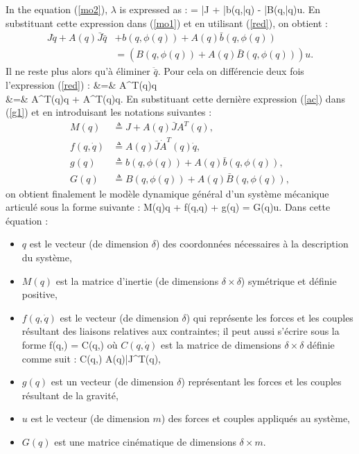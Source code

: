 \vspace{5mm}


In the equation (\ref{mo2}), $\lambda$ is expressed as :
\eqnn
\lambda = \bar{J} + \bar{b}(q,\bar{q}) - \bar{B}(q,\bar{q})u.
\eeqnn
En substituant cette expression dans (\ref{mo1}) et en utilisant (\ref{red}), on obtient :
\begin{equation} \begin{split}
J\ddot{q} + A(q)\bar{J}\ddot{\bar{q}} &+ b(q,\phi(q)) + A(q)\bar{b}(q,\phi(q)) \\
&= (B(q,\phi(q)) + A(q)\bar{B}(q,\phi(q)))u \label{g1}.
\end{split} \end{equation}
Il ne reste plus alors qu'à éliminer $\ddot {\bar q}$. Pour cela on différencie deux
fois l'expression (\ref{red}) :
\eqn
{} &=& A^{T}(q)\dot q \\
  &=& A^{T}(q)\ddot q + \dot A^T(q)\dot q. \label{ac}
\eeqn
En substituant cette dernière expression (\ref{ac}) dans (\ref{g1}) et en introduisant les
notations suivantes :
\begin{equation*} \begin{split}
M(q) &\triangleq J + A(q)\bar{J}A^{T}(q), \\
f(q,\dot{q}) &\triangleq A(q)\bar{J}\dot{A}^{T}(q)\dot{q}, \\
g(q) &\triangleq b(q,\phi(q)) + A(q)\bar{b}(q,\phi(q)), \\
G(q) &\triangleq B(q,\phi(q)) + A(q)\bar{B}(q,\phi(q)),
\end{split} \end{equation*}
on obtient finalement le modèle dynamique général d'un système mécanique articulé 
sous la forme suivante :
\eqn
M(q)\ddot q + f(q,\dot q) + g(q) = G(q)u. \label{modmecgen}
\eeqn
\noindent Dans cette équation :
\begin{itemize}
\item $q$ est le vecteur (de dimension $\delta$) des coordonnées nécessaires 
à la description du système,
\item $M(q)$ est la matrice d'inertie (de dimensions $\delta \times \delta$) symétrique et
définie positive,
\item $f(q,\dot{q})$ est le vecteur (de dimension $\delta$) qui représente les forces et
les couples résultant des liaisons relatives aux contraintes; il peut aussi s'écrire 
sous la forme 
\eqnn
f(q,) = C(q,)
\eeqnn
où $C(q,\dot{q})$ est la matrice de dimensions $\delta \times \delta$ définie
comme suit :
\eqnn
C(q,) \triangleq A(q)\bar{J}^{T}(q),
\eeqnn
\item $g(q)$ est un vecteur (de dimension $\delta$) représentant les forces et les
couples résultant de la gravité,
\item $u$ est le vecteur (de dimension $m$) des forces et couples appliqués au système,
\item $G(q)$ est une matrice cinématique de dimensions $\delta \times m$.
\end{itemize}

